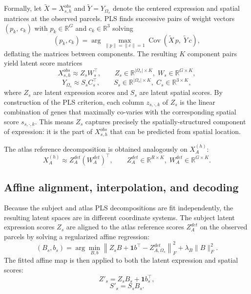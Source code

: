 \documentclass[11pt]{article}
\numberwithin{equation}{section}
\begin{document}
Formally, let $\tilde X = X_{s,h}^{obs}$ and $\tilde Y = Y_{\Omega_s}$ denote the
centered expression and spatial matrices at the observed parcels.  PLS finds successive
pairs of weight vectors $(p_k,\, c_k)$ with $p_k\in\mathbb{R}^G$ and
$c_k\in\mathbb{R}^3$ solving
\begin{equation}
  \label{eq:pls-objective}
  (p_k, c_k) = \arg\max_{\|p\|=\|c\|=1} \operatorname{Cov}\!\left(\tilde X\, p,\; \tilde Y\, c\right),
\end{equation}
deflating the matrices between components.  The resulting $K$ component pairs yield
latent score matrices
\begin{equation}
  \label{eq:det-expression-decomp}
  X_{s,h}^{obs} \approx Z_s W_s^\top,
  \qquad
  Z_s \in \mathbb{R}^{|\Omega_s|\times K},\;
  W_s \in \mathbb{R}^{G\times K},
\end{equation}
\begin{equation}
  \label{eq:det-spatial-decomp}
  Y_{\Omega_s} \approx S_s C_s^\top,
  \qquad
  S_s \in \mathbb{R}^{|\Omega_s|\times K},\;
  C_s \in \mathbb{R}^{3\times K},
\end{equation}
where $Z_s$ are latent expression scores and $S_s$ are latent spatial scores.  By
construction of the PLS criterion, each column $z_{s,\cdot,k}$ of $Z_s$ is the linear
combination of genes that maximally co-varies with the corresponding spatial score
$s_{s,\cdot,k}$.  This means $Z_s$ captures precisely the spatially-structured
component of expression: it is the part of $X_{s,h}^{obs}$ that can be predicted
from spatial location.

The atlas reference decomposition is obtained analogously on $X_A^{(h)}$:
\begin{equation}
  \label{eq:det-atlas-decomp}
  X_A^{(h)} \approx Z_A^{det}\!\left(W_A^{det}\right)^\top,
  \qquad
  Z_A^{det}\in\mathbb{R}^{R\times K},\;
  W_A^{det}\in\mathbb{R}^{G\times K}.
\end{equation}

\subsection{Affine alignment, interpolation, and decoding}
\label{sec:det-align}

Because the subject and atlas PLS decompositions are fit independently, the resulting
latent spaces are in different coordinate systems.  The subject latent expression
scores $Z_s$ are aligned to the atlas reference scores $Z_A^{det}$ on the observed
parcels by solving a regularized affine regression:
\begin{equation}
  \label{eq:det-affine-fit}
  (B_s,b_s)
  =
  \arg\min_{B,b}
  \left\|
  Z_s B + \mathbf{1}b^\top - Z_{A,\Omega_s}^{det}
  \right\|_F^2
  +
  \lambda_B \|B\|_F^2.
\end{equation}
The fitted affine map is then applied to both the latent expression and spatial
scores:
\begin{equation}
  \label{eq:det-affine-map}
  Z'_s = Z_s B_s + \mathbf{1}b_s^\top,
\end{equation}
\begin{equation}
  \label{eq:det-spatial-transport}
  S'_s = S_s B_s.
\end{equation}
\end{document}
